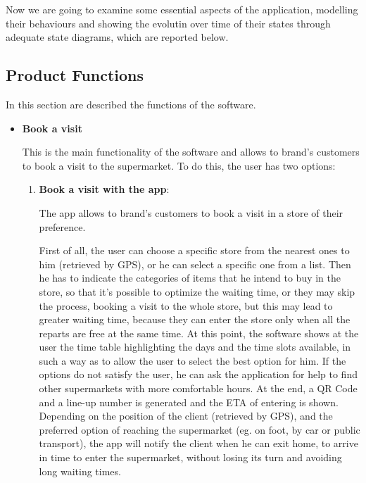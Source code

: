 \documentclass{article}
\begin{document}
		Now we are going to examine some essential aspects of the application, modelling their behaviours and showing the evolutin over time of their states through adequate state diagrams, which are reported below.
		
	\subsection{Product Functions}
		
	In this section are described the functions of the software.
	
	\begin{itemize}
		
		\item {\bfseries Book a visit}
		
		This is the main functionality of the software and allows to brand's customers to book a visit to the supermarket. To do this, the user has two options:
		
		\begin{enumerate}
			
			\item {\bfseries Book a visit with the app}:
			
			The app allows to brand's customers to book a visit in a store of their preference.
			
			First of all, the user can choose a specific store from the nearest ones to him (retrieved by GPS), or he can select a specific one from a list. Then he has to indicate the categories of items that he intend to buy in the store, so that it's possible to optimize the waiting time, or they may skip the process, booking a visit to the whole store, but this may lead to greater waiting time, because they can enter the store only when all the reparts are free at the same time. At this point, the software shows at the user the time table highlighting the days and the time slots available, in such a way as to allow the user to select the best option for him. If the options do not satisfy the user, he can ask the application for help to find other supermarkets with more comfortable hours. At the end, a QR Code and a line-up number is generated and the ETA of entering is shown. Depending on the position of the client (retrieved by GPS), and the preferred option of reaching the supermarket (eg. on foot, by car or public transport), the app will notify the client when he can exit home, to arrive in time to enter the supermarket, without losing its turn and avoiding long waiting times.
			

\end{enumerate}
\end{itemize}
\end{document}
